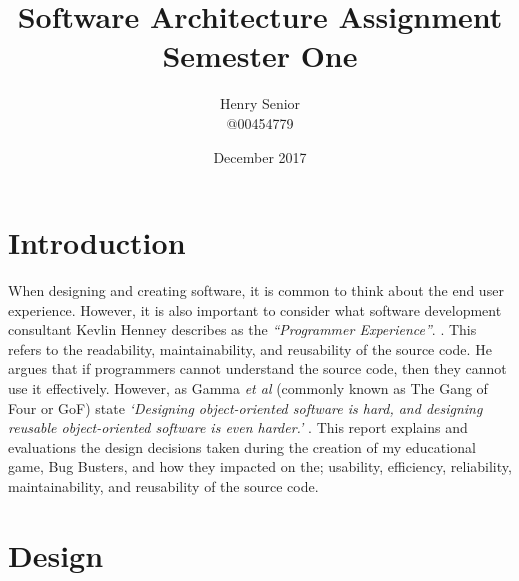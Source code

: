 \documentclass[a4paper,12pt]{article}
\begin{document}
	
\title{Software Architecture Assignment Semester One}
\author{Henry Senior\\@00454779}
\date{December 2017}

\maketitle

\section*{Introduction}
When designing and creating software, it is common to think about the end user experience. However, it is also important to consider what software development consultant Kevlin Henney describes as the \textit{``Programmer Experience''}. \cite{FizzBuzz}. This refers to the readability, maintainability, and reusability of the source code. He argues that if programmers cannot understand the source code, then they cannot use it effectively. However, as Gamma \textit{et al} (commonly known as The Gang of Four or GoF) state \textit{`Designing object-oriented software is hard, and designing reusable object-oriented software is even harder.'} \cite{GoF-Book}. This report explains and evaluations the design decisions taken during the creation of my educational game, Bug Busters, and how they impacted on the; usability, efficiency, reliability, maintainability, and reusability of the source code. 

\section*{Design}
\end{document}
